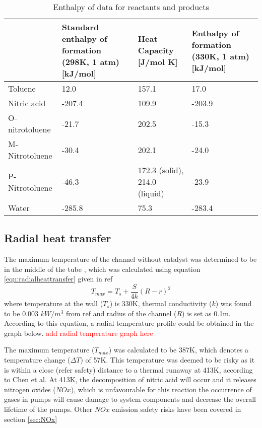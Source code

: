 \begin{table}[H]
\centering
\caption{Enthalpy of data for reactants and products}
\label{tab:Heat enthalpy table}
\begin{tabularx}{\linewidth}{l|XXX}
\toprule
                                                                & Standard enthalpy of formation (298K, 1 atm) [kJ/mol] & Heat Capacity [J/mol K] & Enthalpy of formation (330K, 1 atm) [kJ/mol] \\ \midrule
Toluene                        & 12.0              & 157.1              & 17.0                     \\
Nitric acid                      & -207.4              & 109.9              & -203.9                       \\
O-nitrotoluene & -21.7             & 202.5              & -15.3              \\ 
M-Nitrotoluene                      & -30.4              & 202.1             & -24.0                       \\
P-Nitrotoluene                      & -46.3              & 172.3 (solid), 214.0 (liquid)             & -23.9                        \\
Water                     & -285.8              & 75.3              & -283.4                        \\
\bottomrule
\end{tabularx}
\end{table}

\subsection{Radial heat transfer}
The maximum temperature of the channel without catalyst was determined to be in the middle of the tube , which was calculated using equation \ref{eqn:radialheattransfer} given in ref
\begin{equation}
    T_{max} = T_s + \frac{S}{4k}(R-r)^2
    \label{eqn:radialheattransfer}
\end{equation}
where temperature at the wall ($T_s$) is 330K, thermal conductivity ($k$) was found to be 0.003 $kW/m^3$ from ref and radius of the channel ($R$) is set as 0.1m. According to this equation, a radial temperature profile could be obtained in the graph below. \textcolor{red}{add radial temperature graph here}

The maximum temperature ($T_{max}$) was calculated to be 387K, which denotes a temperature change ($\Delta T$) of 57K. This temperature was deemed to be risky as it is within a close (refer safety) distance to a thermal runaway at 413K, according to Chen et al. At 413K, the decomposition of nitric acid will occur and it releases nitrogen oxides ($NOx$), which is unfavourable for this reaction the occurrence of gases in pumps will cause damage to system components and decrease the overall lifetime of the pumps. Other $NOx$ emission safety risks have been covered in section \ref{sec:NOx}

